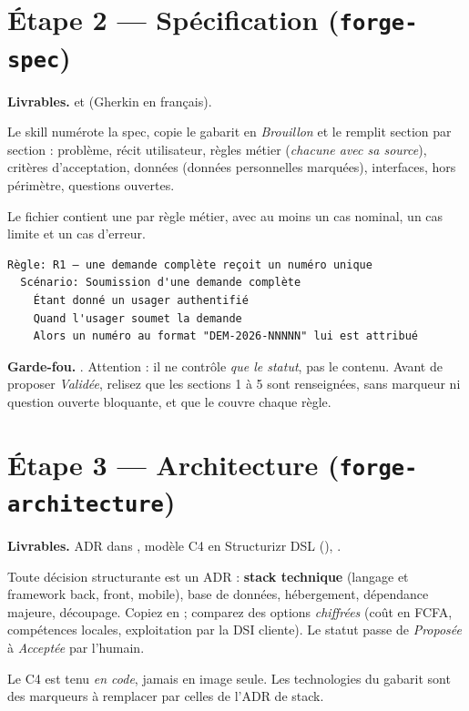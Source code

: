 \section{Étape 2 --- Spécification (\texttt{forge-spec})}
\textbf{Livrables.}  et  (Gherkin en français).

Le skill numérote la spec, copie le gabarit en \emph{Brouillon} et le remplit section par section : problème, récit utilisateur, règles métier (\emph{chacune avec sa source}), critères d'acceptation, données (données personnelles marquées), interfaces, hors périmètre, questions ouvertes.

Le fichier  contient une  par règle métier, avec au moins un cas nominal, un cas limite et un cas d'erreur.

\begin{lstlisting}
Règle: R1 — une demande complète reçoit un numéro unique
  Scénario: Soumission d'une demande complète
    Étant donné un usager authentifié
    Quand l'usager soumet la demande
    Alors un numéro au format "DEM-2026-NNNNN" lui est attribué
\end{lstlisting}

\textbf{Garde-fou.} . Attention : il ne contrôle \emph{que le statut}, pas le contenu. Avant de proposer \emph{Validée}, relisez que les sections 1 à 5 sont renseignées, sans marqueur \cmd{[...]} ni question ouverte bloquante, et que le  couvre chaque règle.

\section{Étape 3 --- Architecture (\texttt{forge-architecture})}
\textbf{Livrables.} ADR dans , modèle C4 en Structurizr DSL (), .

Toute décision structurante est un ADR : \textbf{stack technique} (langage et framework back, front, mobile), base de données, hébergement, dépendance majeure, découpage. Copiez  en  ; comparez des options \emph{chiffrées} (coût en FCFA, compétences locales, exploitation par la DSI cliente). Le statut passe de \emph{Proposée} à \emph{Acceptée} par l'humain.

Le C4 est tenu \emph{en code}, jamais en image seule. Les technologies du gabarit sont des marqueurs  à remplacer par celles de l'ADR de stack.

